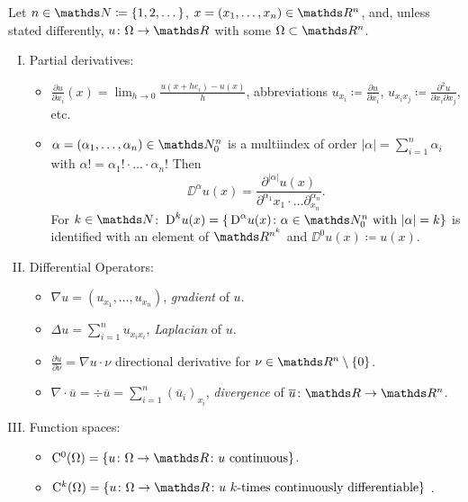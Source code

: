 \newpage
\begin{ntion}
  Let $n \in \N \coloneqq \{1,2,\dots\}$, $x  = (x_1,\dots, x_n) \in \R^n$, and, unless stated differently, $u \colon \Omega \to \R$ with some $\Omega \subset \R^n$.
  \begin{enumerate}[I)]
    \item Partial derivatives:
      \begin{itemize}
        \item $\frac{\partial u}{\partial x_i}(x) = \lim_{h \to 0} \frac{u(x + he_i) - u(x)}{h}$, abbreviations $u_{x_i} \coloneq \frac{\partial u}{\partial x_i}$, $u_{x_i x_j} \coloneqq \frac{\partial^2 u}{\partial x_i \partial x_j}$, etc.
        \item $\alpha = (\alpha_1,\dots,\alpha_n) \in \N_0^n$ is a multiindex of order $|\alpha| = \sum_{i = 1}^n \alpha_i$ with $\alpha! = \alpha_1! \cdot\ldots\cdot\alpha_n!$
          Then
          $$
          \DD^\alpha u(x) = \frac{\partial^|\alpha| u(x)}{\partial^{\alpha_1} x_1 \cdot \ldots \partial^{\alpha_n}_{x_n}}.
          $$
          For $k \in \N$: $\DD^k u(x) = \{\DD^\alpha u(x) \colon \alpha \in \N_0^n \text{ with } |\alpha| = k \}$ is identified with an element of $\R^{n^k}$ and $\DD^0 u(x) \coloneqq u(x)$.
      \end{itemize}

    \item Differential Operators:
      \begin{itemize}
        \item $\nabla u = (u_{x_1}, \dots, u_{x_n})$, \emph{gradient} of $u$.
        \item $\Delta u = \sum_{i = 1}^n u_{x_i x_i}$, \emph{Laplacian} of $u$.
        \item $\frac{\partial u}{\partial \nu} = \nabla u \cdot \nu$ directional derivative for $\nu \in \R^n \setminus\{0\}$.
        \item $\nabla \cdot \overline u = \div \overline u = \sum_{i = 1}^n (\overline u_i)_{x_i}$, \emph{divergence} of $\overline u \colon \R \to \R^n$.
      \end{itemize}

    \item Function spaces:
      \begin{itemize}
        \item $\CC^0(\Omega) = \{u \colon \Omega \to \R \colon u \text{ continuous}\}$.
        \item $\CC^k(\Omega) = \{u \colon \Omega \to \R \colon u \text{ $k$-times continuously differentiable}\}$ .
          

\end{itemize}
\end{enumerate}
\end{ntion}

